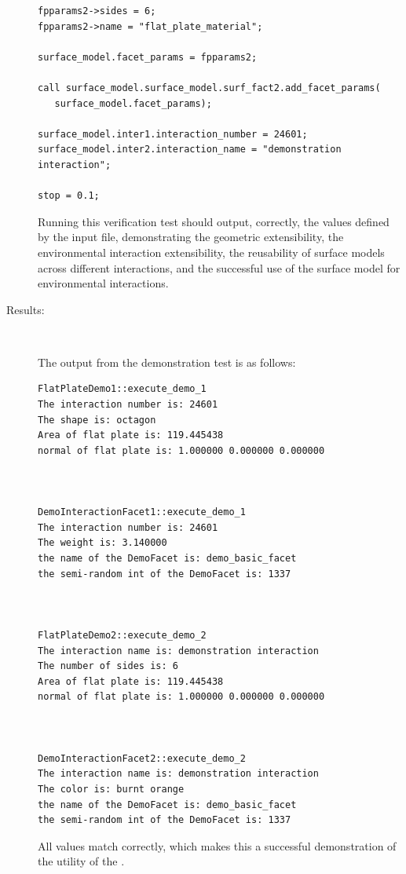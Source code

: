 \begin{description}
\begin{verbatim}
fpparams2->sides = 6;
fpparams2->name = "flat_plate_material";

surface_model.facet_params = fpparams2;

call surface_model.surface_model.surf_fact2.add_facet_params(
   surface_model.facet_params);

surface_model.inter1.interaction_number = 24601;
surface_model.inter2.interaction_name = "demonstration interaction";

stop = 0.1;

\end{verbatim}

Running this verification test should output, correctly, the values
defined by the input file, demonstrating the geometric
extensibility, the environmental interaction extensibility, the reusability
of surface models across different interactions, and the successful
use of the surface model for environmental interactions.

\item[Results:]\ \newline

The output from the demonstration test is as follows:

\begin{verbatim}
FlatPlateDemo1::execute_demo_1
The interaction number is: 24601
The shape is: octagon
Area of flat plate is: 119.445438
normal of flat plate is: 1.000000 0.000000 0.000000



DemoInteractionFacet1::execute_demo_1
The interaction number is: 24601
The weight is: 3.140000
the name of the DemoFacet is: demo_basic_facet
the semi-random int of the DemoFacet is: 1337



FlatPlateDemo2::execute_demo_2
The interaction name is: demonstration interaction
The number of sides is: 6
Area of flat plate is: 119.445438
normal of flat plate is: 1.000000 0.000000 0.000000



DemoInteractionFacet2::execute_demo_2
The interaction name is: demonstration interaction
The color is: burnt orange
the name of the DemoFacet is: demo_basic_facet
the semi-random int of the DemoFacet is: 1337
\end{verbatim}

All values match correctly, which makes this a successful demonstration
of the utility of the \ModelDesc.
\end{description}

